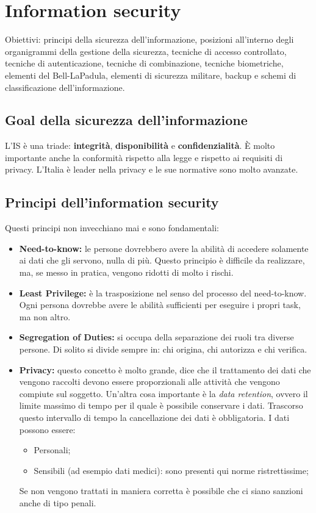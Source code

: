\chapter{Information security}

Obiettivi: principi della sicurezza dell'informazione, posizioni all'interno
degli organigrammi della gestione della sicurezza, tecniche di accesso
controllato, tecniche di autenticazione, tecniche di combinazione,
tecniche biometriche, elementi del Bell-LaPadula, elementi di sicurezza
militare, backup e schemi di classificazione dell'informazione.


\section{Goal della sicurezza dell'informazione}

L'IS è una triade: \textbf{integrità}, \textbf{disponibilità} e
\textbf{confidenzialità}. È molto importante anche la conformità rispetto alla
legge e rispetto ai requisiti di privacy. L'Italia è leader nella privacy e le
sue normative sono molto avanzate.


\section{Principi dell'information security}

Questi principi non invecchiano mai e sono fondamentali:
\begin{itemize}
  \item \textbf{Need-to-know:} le persone dovrebbero avere la abilità di
  accedere solamente ai dati che gli servono, nulla di più. Questo principio è
  difficile da realizzare, ma, se messo in pratica, vengono ridotti di molto i
  rischi.
  \item \textbf{Least Privilege:} è la trasposizione nel senso del processo
  del need-to-know. Ogni persona dovrebbe avere le abilità sufficienti per
  eseguire i propri task, ma non altro.
  \item \textbf{Segregation of Duties:} si occupa della separazione dei ruoli
  tra diverse persone. Di solito si divide sempre in: chi origina, chi
  autorizza e chi verifica.
  \item \textbf{Privacy:} questo concetto è molto grande, dice che il
  trattamento dei dati che vengono raccolti devono essere proporzionali alle
  attività che vengono compiute sul soggetto. Un'altra cosa importante è la
  \textit{data retention}, ovvero il limite massimo di tempo per il quale è
  possibile conservare i dati. Trascorso questo intervallo di tempo la
  cancellazione dei dati è obbligatoria. I dati possono essere:
  \begin{itemize}
    \item Personali;
    \item Sensibili (ad esempio dati medici): sono presenti qui norme
    ristrettissime;
  \end{itemize}
  Se non vengono trattati in maniera corretta è possibile che ci siano sanzioni
  anche di tipo penali.
\end{itemize}

